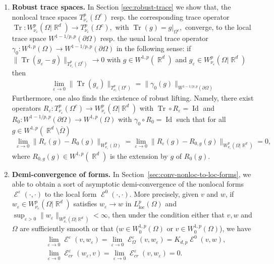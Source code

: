 \documentclass[12pt, reqno]{amsart}%
\theoremstyle{plain}  %
\theoremstyle{definition}  %
\numberwithin{equation}{section}
\DeclareMathOperator{\cE}{\mathcal{E}}
\DeclareMathOperator{\R}{\mathbb{R}}
\newcommand{\eps}{\varepsilon}
\newcommand{\WnuOmRa}{W^p_{\nu_\eps}(\Omega|\R^d )}
\newcommand{\TnuOma}{T^p_{\nu_\eps} (\Omega^c)}
\newcommand{\WnuOma}{W^{p}_{\nu_\eps}(\Omega)}
\begin{document}
\begin{enumerate}[$(A)$]
\item \textbf{Robust trace spaces.}
In Section \ref{sec:robust-trace} we show that, the nonlocal trace spaces $\TnuOma$ resp. the corresponding trace operator $\operatorname{Tr} : \WnuOmRa \to \TnuOma,$
with $ \operatorname{Tr}(g) = g|_{\Omega^c},$
converge, to the  local trace space $W^{1-1/p,p}(\partial\Omega)$ resp. the usual local  trace operator $\gamma_0 : W^{1,p}(\Omega) \to W^{1-1/p,p}(\partial\Omega)$ in the following sense:
if $\|\operatorname{Tr}(g_\eps-g)\|_{\TnuOma}\to 0$ with $g\in W^{1,p}(\R^d)$ and $g_\eps\in \WnuOmRa$ then
\begin{align*}
\lim_{\eps\to0}	\|\operatorname{Tr}(g_\eps)\|_{\TnuOma}=
\|\gamma_0(g)\|_{W^{1-1/p ,p}(\partial\Omega)}
\end{align*}
Furthermore, one also finds the existence of robust lifting. Namely, there exist operators $R_\eps: \TnuOma\to \WnuOmRa$ with $\operatorname{Tr}\circ R_\eps= \operatorname{Id}$  and $R_0:W^{1-1/p , p}(\partial \Omega)\to W^{1,p}(\Omega)$ with $\gamma_0\circ R_0= \operatorname{Id}$ such that for all $g\in W^{1,p}(\R^d\setminus\overline{\Omega})$
\begin{align*}
\lim_{\eps\to0}\|R_\eps(g)-R_0(g)\|_{\WnuOma}= \lim_{\eps\to0}\|R_\eps(g)-R_{0,g}(g)\|_{\WnuOmRa}=0,
\end{align*}
where $R_{0,g}(g)\in W^{1,p}(\R^d)$ is the extension by $g$ of $R_{0}(g)$.
\item  \textbf{Demi-convergence of forms.}
In Section~\ref{sec:conv-nonloc-to-loc-forms},  we able to obtain a sort of asymptotic demi-convergence of the nonlocal forms $\cE^\eps(\cdot,\cdot)$ to the local form $\cE^0(\cdot,\cdot)$. %
More precisely, given $v$ and $w$, if $w_\eps\in \WnuOmRa$ satisfies  $w_\eps \to w$ in $L^p_{\operatorname{loc}}(\Omega)$  and $\sup_{\eps>0} \| w_\eps\|_{\WnuOmRa}<\infty $, then
under the condition either that $v,w$ and $\Omega$ are sufficiently smooth or that ($w\in W^{1,p}_0(\Omega)$ or $v\in W^{1,p}_0(\Omega)$), we have
\begin{align*}
&\lim_{\eps\to0} \cE^\eps(v,w_\eps)= \lim_{\eps\to0}\cE^\eps_\Omega (v,w_\eps)= K_{d,p}\cE^0(v,w),\\
&\lim_{\eps\to0} \cE^\eps_{cr}(w_\eps,v)
=\lim_{\eps\to0}\cE^\eps_{cr} (v,w_\eps)
=0.
\end{align*}


\end{enumerate}
\end{document}
